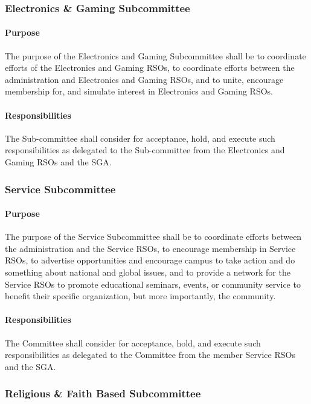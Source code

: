 \documentclass[12pt]{scrreprt}
\begin{document}
\subsubsection{Electronics \& Gaming Subcommittee}
\paragraph{Purpose}
​The purpose of the Electronics and Gaming Subcommittee shall be to
coordinate efforts of the Electronics and Gaming RSOs, to coordinate efforts between the
administration and Electronics and Gaming RSOs, and to unite, encourage membership for,
and simulate interest in Electronics and Gaming RSOs.

\paragraph{Responsibilities}
The Sub-committee shall consider for acceptance, hold, and execute such responsibilities as delegated to the Sub-committee from the Electronics and Gaming RSOs and the SGA.

\subsubsection{Service Subcommittee}

\paragraph{Purpose}
​The purpose of the Service Subcommittee shall be to coordinate efforts
between the administration and the Service RSOs, to encourage membership in Service
RSOs, to advertise opportunities and encourage campus to take action and do something
about national and global issues, and to provide a network for the Service RSOs to promote
educational seminars, events, or community service to benefit their specific organization,
but more importantly, the community.

\paragraph{Responsibilities}
The Committee shall consider for acceptance, hold, and execute such
responsibilities as delegated to the Committee from the member Service
RSOs and the SGA.


\subsubsection{Religious \& Faith Based Subcommittee}
\end{document}
